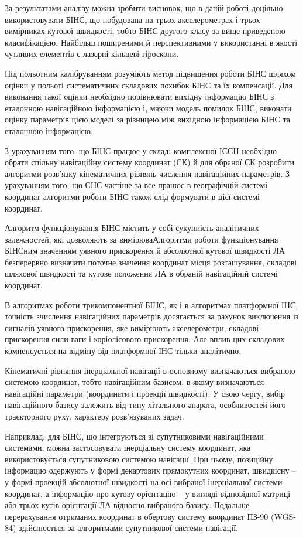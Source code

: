 За результатами аналізу можна зробити висновок, що в даній роботі доцільно 
використовувати БІНС, що побудована на  трьох акселерометрах  і трьох вимірниках 
кутової швидкості, тобто  БІНС другого класу за вище приведеною класифікацією. 
Найбільш поширеними й перспективними у використанні в якості чутливих елементів є 
лазерні кільцеві гіроскопи. 

Під польотним калібруванням розуміють метод підвищення роботи БІНС шляхом оцінки у польоті 
систематичних складових похибок БІНС та їх компенсації. Для виконання такої оцінки необхідно 
порівнювати вихідну інформацію БІНС з еталонною навігаційною інформацією і, маючи модель 
помилок БІНС, виконати оцінку параметрів цією моделі за різницею між вихідною інформацією 
БІНС та еталонною інформацією.

З урахуванням того, що БІНС працює у складі комплексної ІССН необхідно обрати спільну 
навігаційну систему  координат (СК) й для обраної СК розробити  алгоритми розв’язку 
кінематичних рівнянь числення навігаційних параметрів. З урахуванням того, 
що СНС частіше за все працює в географічній системі координат алгоритми 
роботи БІНС також слід формувати в цієї системі координат.  

Алгоритм функціонування БІНС містить у собі сукупність аналітичних залежностей, які 
дозволяють за вимірюваАлгоритми роботи функціонування БІНСним значенням уявного прискорення й абсолютної кутової швидкості 
ЛА безперервно визначати поточне значення координат місця розташування, складові 
шляхової швидкості та кутове положення ЛА в обраній навігаційній системі координат.

В алгоритмах роботи  трикомпонентної БІНС, як і в алгоритмах платформної ІНС, точність 
зчислення навігаційних параметрів досягається за рахунок виключення із сигналів уявного 
прискорення, яке вимірюють акселерометри, складові прискорення сили ваги і коріолісового 
прискорення. Але вплив цих складових компенсується на відміну від платформної ІНС 
тільки аналітично. 

Кінематичні рівняння інерціальної  навігації в основному визначаються вибраною системою 
координат, тобто навігаційним базисом, в якому визначаються навігаційні параметри 
(координати і проекції швидкості). У свою чергу, вибір навігаційного базису залежить 
від типу літального апарата, особливостей його траєкторного руху, характеру розв'язуваних 
задач.

Наприклад, для БІНС, що інтегруються зі супутниковими навігаційними системами, можна 
застосовувати інерціальну систему координат, яка використовується супутниковою системою 
навігації.  При цьому, позиційну інформацію одержують у формі декартових прямокутних 
координат, швидкісну -- у формі проекцій абсолютної швидкості на осі вибраної інерціальної 
системи координат, а інформацію про кутову орієнтацію -- у вигляді відповідної матриці 
або трьох кутів орієнтації ЛА відносно вибраного базису. Подальше перерахування отриманих 
координат в обертову систему координат ПЗ-90 (WGS-84) здійснюється за алгоритмами 
супутникової системи навігації.

